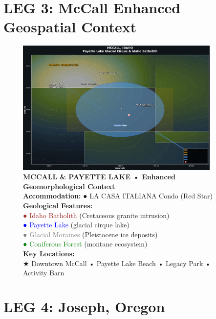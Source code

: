 \documentclass[
  10pt,
]{article}
\begin{document}
\newpage

\section{\texorpdfstring{\textcolor{primary}{LEG 3: McCall Enhanced Geospatial Context}}{}}\label{section-23}

\begin{figure}[h]
\centering
\includegraphics[width=0.9\textwidth]{images/mccall_enhanced_geospatial.png}
\caption{\textbf{\textcolor{primary}{MCCALL & PAYETTE LAKE • Enhanced Geomorphological Context}} \\ 
\textbf{\textcolor{secondary}{Accommodation:}} \textcolor{mapred}{●} LA CASA ITALIANA Condo (Red Star) \\
\textbf{\textcolor{secondary}{Geological Features:}} \\
\textcolor{brown}{●} \textcolor{brown}{Idaho Batholith} (Cretaceous granite intrusion) \\
\textcolor{blue}{●} \textcolor{blue}{Payette Lake} (glacial cirque lake) \\
\textcolor{gray}{●} \textcolor{gray}{Glacial Moraines} (Pleistocene ice deposits) \\
\textcolor{green}{●} \textcolor{green}{Coniferous Forest} (montane ecosystem) \\
\textbf{\textcolor{secondary}{Key Locations:}} \\
\textcolor{mapred}{★} Downtown McCall • Payette Lake Beach • Legacy Park • Activity Barn}
\end{figure}

\newpage

\section{\texorpdfstring{\textcolor{primary}{LEG 4: Joseph, Oregon}}{}}\label{section-24}
\end{document}
